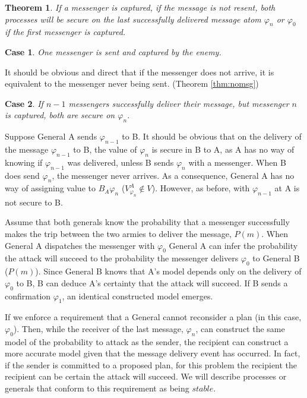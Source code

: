 \documentclass[12pt,oneside]{article}
\newtheorem{thm}{Theorem}
\newtheorem{case}{Case}[thm]
\begin{document}
\begin{thm}
If a messenger is captured, if the message is not resent, both processes will be secure on the last successfully delivered message atom $\varphi_{n}$ or $\varphi_0$ if the first messenger is captured.
\end{thm}

\begin{case}
One messenger is sent and captured by the enemy.
\end{case}

It should be obvious and direct that if the messenger does not arrive, it is equivalent to the messenger never being sent. (Theorem \ref{thm:nomsg})

\begin{case}
If $n-1$ messengers successfully deliver their message, but messenger $n$ is captured, both are secure on $\varphi_{n}$.
\end{case}

Suppose General A sends $\varphi_{n-1}$ to B. It should be obvious that on the delivery of the message $\varphi_{n-1}$ to B, the value of $\varphi_{n}$ is secure in B to A, as A has no way of knowing if $\varphi_{n-1}$ was delivered, unless B sends $\varphi_{n}$ with a messenger. When B does send $\varphi_{n}$, the messenger never arrives. As a consequence, General A has no way of assigning value to $B_A \varphi_n$ ($V_{\varphi_n}^A \not \in V$). However, as before, with $\varphi_{n-1}$ at A is not secure to B.

Assume that both generals know the probability that a messenger successfully makes the trip between the two armies to deliver the message, $P(m)$. When General A dispatches the messenger with $\varphi_0$ General A can infer the probability the attack will succeed to the probability the messenger delivers $\varphi_0$ to General B ($P(m)$). Since General B knows that A's model depends only on the delivery of $\varphi_0$ to B, B can deduce A's certainty that the attack will succeed. If B sends a confirmation $\varphi_1$, an identical constructed model emerges.

If we enforce a requirement that a General cannot reconsider a plan (in this case, $\varphi_0$). Then, while the receiver of the last message, $\varphi_n$, can construct the same model of the probability to attack as the sender, the recipient can construct a more accurate model given that the message delivery event has occurred. In fact, if the sender is committed to a proposed plan, for this problem the recipient the recipient can be certain the attack will succeed. We will describe processes or generals that conform to this requirement as being $stable$.
\end{document}
